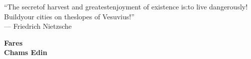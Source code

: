 \begin{itshape}
\begin{center}
    \vspace*{1em}
    {\large ``The secret\phantom{c}of harvest and greatest\phantom{c}enjoyment of existence is:\phantom{c}to live dangerously! Build\phantom{c}your cities on the\phantom{c}slopes of Vesuvius!''} \\    \vspace{0.5em}
    \small --- Friedrich Nietzsche
    \vspace*{2em}
\end{center}
\vfill

\begin{flushright}
    \textbf{\Large Fares}\\
    \vspace{0.3em}
    \textbf{\Large Chams Edin}
\end{flushright}

\end{itshape}